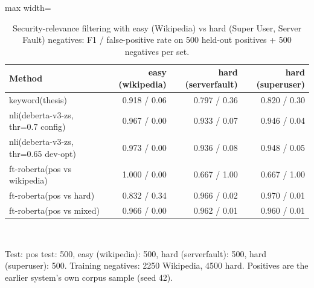 \begin{table}[t]
\centering
\caption{Security-relevance filtering with easy (Wikipedia) vs hard (Super User, Server Fault) negatives: F1 / false-positive rate on 500 held-out positives + 500 negatives per set.}
\label{tab:relevance}
\small
\begin{adjustbox}{max width=\textwidth}
\begin{tabular}{lrrr}
\toprule
Method & easy (wikipedia) & hard (serverfault) & hard (superuser) \\
\midrule
keyword(thesis) & 0.918 / 0.06 & 0.797 / 0.36 & 0.820 / 0.30 \\
nli(deberta-v3-zs, thr=0.7 config) & 0.967 / 0.00 & 0.933 / 0.07 & 0.946 / 0.04 \\
nli(deberta-v3-zs, thr=0.65 dev-opt) & 0.973 / 0.00 & 0.936 / 0.08 & 0.948 / 0.05 \\
ft-roberta(pos vs wikipedia) & 1.000 / 0.00 & 0.667 / 1.00 & 0.667 / 1.00 \\
ft-roberta(pos vs hard) & 0.832 / 0.34 & 0.966 / 0.02 & 0.970 / 0.01 \\
ft-roberta(pos vs mixed) & 0.966 / 0.00 & 0.962 / 0.01 & 0.960 / 0.01 \\
\bottomrule
\end{tabular}
\end{adjustbox}
\\[2pt]\parbox{\textwidth}{\footnotesize Test: pos test: 500, easy (wikipedia): 500, hard (serverfault): 500, hard (superuser): 500. Training negatives: 2250 Wikipedia, 4500 hard. Positives are the earlier system's own corpus sample (seed 42).}
\end{table}
